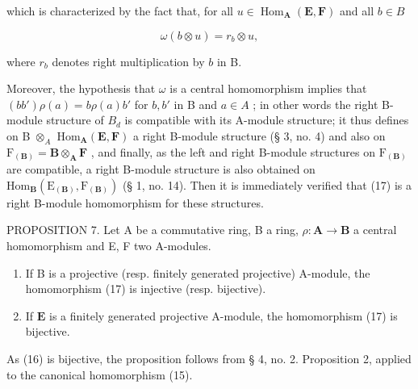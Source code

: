 which is characterized by the fact that, for all \(u \in \operatorname{Hom}_{\mathbf{A}}(\mathbf{E}, \mathbf{F})\) and all \(b \in B\)

\[
\omega (b \otimes u) = r _ {b} \otimes u,\tag{18}
\]

where \(r_b\) denotes right multiplication by \(b\) in B.

Moreover, the hypothesis that \(\omega\) is a central homomorphism implies that \((bb')\rho(a) = b\rho(a)b'\) for \(b, b'\) in B and \(a \in A\) ; in other words the right B-module structure of \(B_d\) is compatible with its A-module structure; it thus defines on B \(\otimes_A\) \(\mathrm{Hom}_{\mathbf{A}}(\mathbf{E}, \mathbf{F})\) a right B-module structure (§ 3, no. 4) and also on \(\mathrm{F}_{(\mathbf{B})} = \mathbf{B} \otimes_{\mathbf{A}} \mathbf{F}\) , and finally, as the left and right B-module structures on \(\mathrm{F}_{(\mathbf{B})}\) are compatible, a right B-module structure is also obtained on \(\mathrm{Hom}_{\mathbf{B}}(\mathrm{E}_{(\mathbf{B})}, \mathrm{F}_{(\mathbf{B})})\) (§ 1, no. 14). Then it is immediately verified that (17) is a right B-module homomorphism for these structures.

PROPOSITION 7. Let A be a commutative ring, B a ring, \(\rho: \mathbf{A} \to \mathbf{B}\) a central homomorphism and E, F two A-modules.

\begin{enumerate}
\def\labelenumi{(\roman{enumi})}
\item
  If B is a projective (resp. finitely generated projective) A-module, the homomorphism (17) is injective (resp. bijective).
\item
  If \(\mathbf{E}\) is a finitely generated projective A-module, the homomorphism (17) is bijective.
\end{enumerate}

As (16) is bijective, the proposition follows from § 4, no. 2. Proposition 2, applied to the canonical homomorphism (15).

